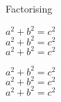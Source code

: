 

















  




\begin{bxExample}{Factorising}


$ a^2 + b^2 = c^2 $ \\



$ a^2 + b^2 = c^2 $ \\

$ a^2 + b^2 = c^2 $ \\

\tcblower

$ a^2 + b^2 = c^2 $ \\


$ a^2 + b^2 = c^2 $ \\

$ a^2 + b^2 = c^2 $

\end{bxExample}



